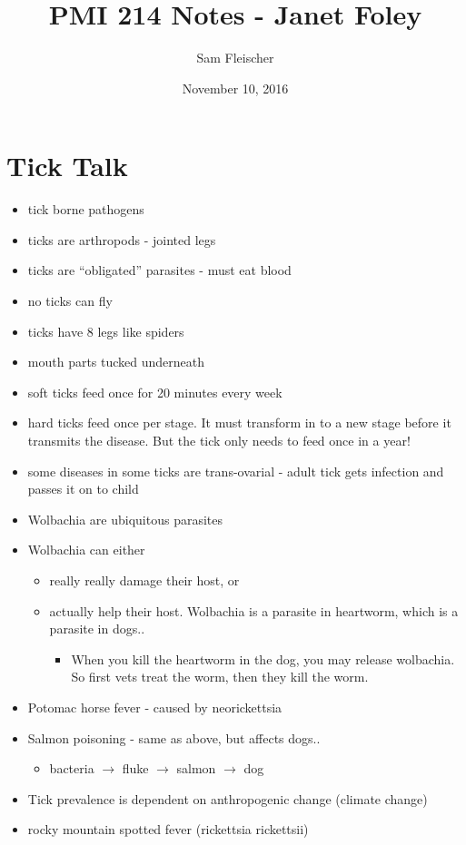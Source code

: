 \documentclass{article}
\title{PMI 214 Notes - Janet Foley}
\author{Sam Fleischer}
\date{November 10, 2016}
\begin{document}
    \maketitle

    \section*{Tick Talk}

    \begin{itemize}
        \item tick borne pathogens
        \item ticks are arthropods - jointed legs
        \item ticks are ``obligated'' parasites - must eat blood
        \item no ticks can fly
        \item ticks have 8 legs like spiders
        \item mouth parts tucked underneath
        \item soft ticks feed once for 20 minutes every week
        \item hard ticks feed once per stage.  It must transform in to a new stage before it transmits the disease.  But the tick only needs to feed once in a year!
        \item some diseases in some ticks are trans-ovarial - adult tick gets infection and passes it on to child
        \item Wolbachia are ubiquitous parasites
        \item Wolbachia can either
        \begin{itemize}
            \item really really damage their host, or
            \item actually help their host.  Wolbachia is a parasite in heartworm, which is a parasite in dogs..
            \begin{itemize}
                \item When you kill the heartworm in the dog, you may release wolbachia.  So first vets treat the worm, then they kill the worm.
            \end{itemize}
        \end{itemize}
        \item Potomac horse fever - caused by neorickettsia
        \item Salmon poisoning - same as above, but affects dogs..
        \begin{itemize}
            \item bacteria $\rightarrow$ fluke $\rightarrow$ salmon $\rightarrow$ dog
        \end{itemize}
        \item Tick prevalence is dependent on anthropogenic change (climate change)
        \item rocky mountain spotted fever (rickettsia rickettsii)
    \end{itemize}
\end{document}
